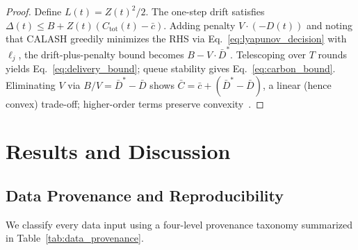 \documentclass[12pt, onecolumn, journal]{IEEEtran}
\begin{document}
\begin{proof}
Define $L(t) = Z(t)^2/2$.
The one-step drift satisfies $\Delta(t) \leq B + Z(t)(C_{\text{tot}}(t) - \bar{c})$.
Adding penalty $V \cdot (-D(t))$ and noting that CALASH greedily minimizes the RHS via Eq.~\eqref{eq:lyapunov_decision} with $\ell_j$, the drift-plus-penalty bound becomes $B - V \cdot \bar{D}^*$.
Telescoping over $T$ rounds yields Eq.~\eqref{eq:delivery_bound}; queue stability gives Eq.~\eqref{eq:carbon_bound}.
Eliminating $V$ via $B/V = \bar{D}^* - \bar{D}$ shows $\bar{C} = \bar{c} + (\bar{D}^* - \bar{D})$, a linear (hence convex) trade-off; higher-order terms preserve convexity~\cite{neely2010lyapunov}.
\end{proof}

\FloatBarrier
\section{Results and Discussion}
\label{sec:results}

\subsection{Data Provenance and Reproducibility}
\label{sec:data_provenance}

We classify every data input using a four-level provenance taxonomy summarized in Table~\ref{tab:data_provenance}.
\end{document}
